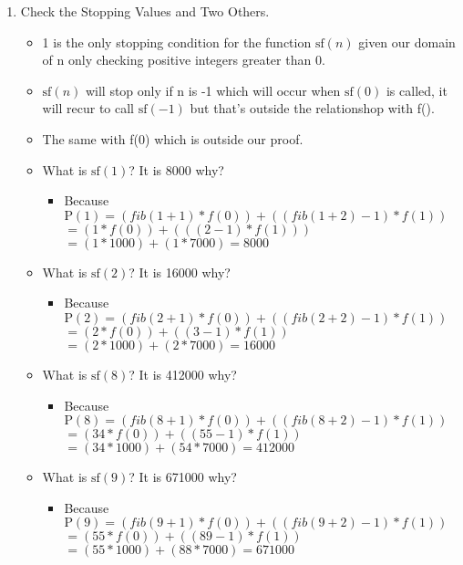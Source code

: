 \documentclass{article}
\begin{document}
\begin{enumerate}
\begin{enumerate}
\begin{enumerate}
        \item Check the Stopping Values and Two Others.
          \begin{itemize}
            \item 1 is the only stopping condition for the function $\textrm{sf}(n)$ given our domain of n only checking positive integers greater than 0.
            \item $\textrm{sf}(n)$ will stop only if n is -1 which will occur when $\textrm{sf}(0)$ is called, it will recur to call $\textrm{sf}(-1)$ but that's outside the relationshop with f().
            \item The same with f(0) which is outside our proof.
            \item What is $\textrm{sf}(1)$? It is 8000 why?
            \begin{itemize}
              \item Because $\textrm{P}(1) = (fib(1 + 1) * f(0)) + ((fib(1 + 2) - 1) * f(1))$ \\
              $ = (1 * f(0)) + (((2 - 1) * f(1)))$ \\
              $ = (1 * 1000) + (1 * 7000) = 8000$
            \end{itemize}
            \item What is $\textrm{sf}(2)$? It is 16000 why?
            \begin{itemize}
              \item Because $\textrm{P}(2) = (fib(2 + 1) * f(0)) + ((fib(2 + 2) - 1) * f(1))$ \\
              $ = (2 * f(0)) + ((3 - 1) * f(1))$ \\
              $ = (2 * 1000) + (2 * 7000) = 16000$
            \end{itemize}
            \item What is $\textrm{sf}(8)$? It is 412000 why?
            \begin{itemize}
              \item Because $\textrm{P}(8) = (fib(8 + 1) * f(0)) + ((fib(8 + 2) - 1) * f(1))$ \\
              $ = (34 * f(0)) + ((55 - 1) * f(1))$ \\
              $ = (34 * 1000) + (54 * 7000) = 412000$
            \end{itemize}
            \item What is $\textrm{sf}(9)$? It is 671000 why?
            \begin{itemize}
              \item Because $\textrm{P}(9) = (fib(9 + 1) * f(0)) + ((fib(9 + 2) - 1) * f(1))$ \\
              $ = (55 * f(0)) + ((89 - 1) * f(1))$ \\
              $ = (55 * 1000) + (88 * 7000) = 671000$
            \end{itemize}
          \end{itemize}


\end{enumerate}
\end{enumerate}
\end{enumerate}
\end{document}
